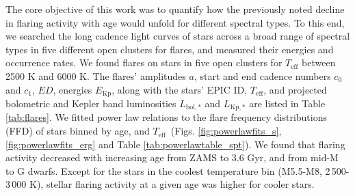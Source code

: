 \documentclass{aa}
\begin{document}
The core objective of this work was to quantify how the previously noted decline in flaring activity with age would unfold for different spectral types. To this end, we searched the long cadence light curves of stars across a broad range of spectral types in five different open clusters for flares, and measured their energies and occurrence rates. We found \unskip\;flares on \unskip\;stars in five open clusters for $T_\mathrm{eff}$ between 2500 K and 6000 K. The flares' amplitudes $a$, start and end cadence numbers $c_0$ and $c_1$, $ED$, energies $E_\mathrm{Kp}$, along with the stars' EPIC ID, $T_\mathrm{eff}$, and projected bolometric and Kepler band luminosities $L_\mathrm{bol,*}$ and $L_\mathrm{Kp,*}$ are listed in Table \ref{tab:flares}. We fitted power law relations to the flare frequency distributions (FFD) of stars binned by age, and $T_\mathrm{eff}$~(Figs. \ref{fig:powerlawfits_s}, \ref{fig:powerlawfits_erg} and Table \ref{tab:powerlawtable_spt}). We found that flaring activity decreased with increasing age from ZAMS to 3.6 Gyr, and from mid-M to G dwarfs. Except for the stars in the coolest temperature bin (M5.5-M8, 2\,500-3\,000 K), stellar flaring activity at a given age was higher for cooler stars.
\end{document}
